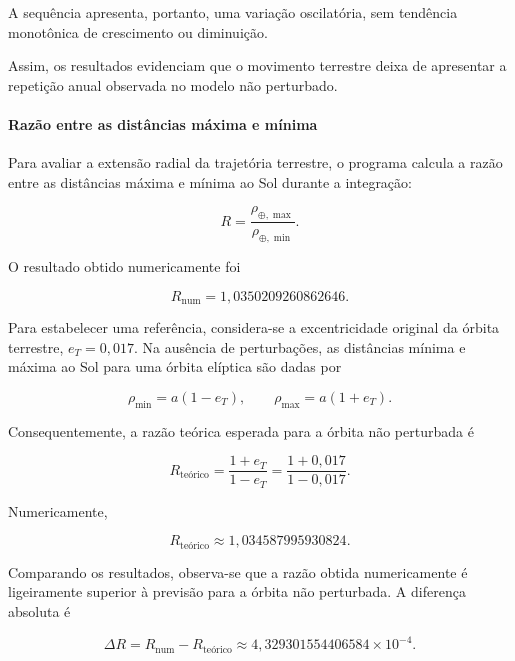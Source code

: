 \documentclass[12pt,a4paper]{article}
\begin{document}
A sequência apresenta, portanto, uma variação oscilatória, sem tendência monotônica de crescimento ou diminuição.

Assim, os resultados evidenciam que o movimento terrestre deixa de apresentar a repetição anual observada no modelo não perturbado.

\paragraph{Razão entre as distâncias máxima e mínima}

Para avaliar a extensão radial da trajetória terrestre, o programa calcula a razão entre as distâncias máxima e mínima ao Sol durante a integração:

\begin{equation}
    R=
    \frac{\rho_{\oplus,\max}}
    {\rho_{\oplus,\min}}.
\end{equation}

O resultado obtido numericamente foi

\begin{equation}
    \boxed{
    R_{\mathrm{num}}
    =
    1,0350209260862646
    }.
\end{equation}

Para estabelecer uma referência, considera-se a excentricidade original da órbita terrestre, $e_T=0,017$. Na ausência de perturbações, as distâncias mínima e máxima ao Sol para uma órbita elíptica são dadas por

\begin{equation}
    \rho_{\min}=a(1-e_T),
    \qquad
    \rho_{\max}=a(1+e_T).
\end{equation}

Consequentemente, a razão teórica esperada para a órbita não perturbada é

\begin{equation}
    R_{\mathrm{teórico}}
    =
    \frac{1+e_T}{1-e_T}
    =
    \frac{1+0,017}{1-0,017}.
\end{equation}

Numericamente,

\begin{equation}
    R_{\mathrm{teórico}}
    \approx1,034587995930824.
\end{equation}

Comparando os resultados, observa-se que a razão obtida numericamente é ligeiramente superior à previsão para a órbita não perturbada. A diferença absoluta é

\begin{equation}
    \Delta R=
    R_{\mathrm{num}}-R_{\mathrm{teórico}}
    \approx4,329301554406584\times10^{-4}.
\end{equation}
\end{document}

